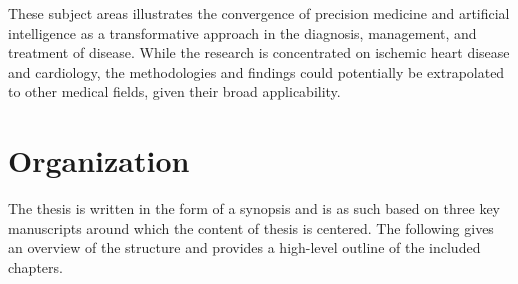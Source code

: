 These subject areas illustrates 
the convergence of precision medicine and artificial
intelligence as a transformative approach in the diagnosis, management,
and treatment of disease.
While the research is concentrated on ischemic heart disease and cardiology,
the methodologies and findings could potentially be extrapolated to other
medical fields, given their broad applicability.

\section*{Organization}

The thesis is written in the form of a synopsis 
and is as such based on three key manuscripts around 
which the content of thesis is centered.
The following gives an overview of the structure and 
provides a high-level outline of the included chapters.

